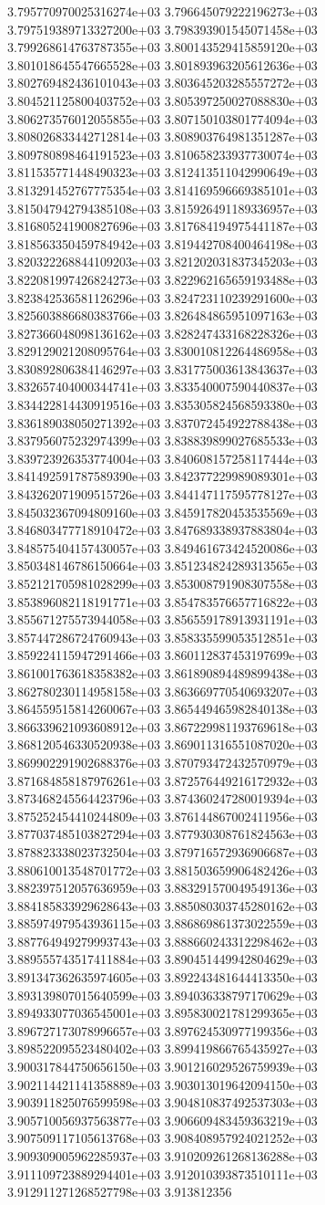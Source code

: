 3.795770970025316274e+03	3.796645079222196273e+03	3.797519389713327200e+03	3.798393901545071458e+03	3.799268614763787355e+03	3.800143529415859120e+03	3.801018645547665528e+03	3.801893963205612636e+03	3.802769482436101043e+03	3.803645203285557272e+03	3.804521125800403752e+03	3.805397250027088830e+03	3.806273576012055855e+03	3.807150103801774094e+03	3.808026833442712814e+03	3.808903764981351287e+03	3.809780898464191523e+03	3.810658233937730074e+03	3.811535771448490323e+03	3.812413511042990649e+03	3.813291452767775354e+03	3.814169596669385101e+03	3.815047942794385108e+03	3.815926491189336957e+03	3.816805241900827696e+03	3.817684194975441187e+03	3.818563350459784942e+03	3.819442708400464198e+03	3.820322268844109203e+03	3.821202031837345203e+03	3.822081997426824273e+03	3.822962165659193488e+03	3.823842536581126296e+03	3.824723110239291600e+03	3.825603886680383766e+03	3.826484865951097163e+03	3.827366048098136162e+03	3.828247433168228326e+03	3.829129021208095764e+03	3.830010812264486958e+03	3.830892806384146297e+03	3.831775003613843637e+03	3.832657404000344741e+03	3.833540007590440837e+03	3.834422814430919516e+03	3.835305824568593380e+03	3.836189038050271392e+03	3.837072454922788438e+03	3.837956075232974399e+03	3.838839899027685533e+03	3.839723926353774004e+03	3.840608157258117444e+03	3.841492591787589390e+03	3.842377229989089301e+03	3.843262071909515726e+03	3.844147117595778127e+03	3.845032367094809160e+03	3.845917820453535569e+03	3.846803477718910472e+03	3.847689338937883804e+03	3.848575404157430057e+03	3.849461673424520086e+03	3.850348146786150664e+03	3.851234824289313565e+03	3.852121705981028299e+03	3.853008791908307558e+03	3.853896082118191771e+03	3.854783576657716822e+03	3.855671275573944058e+03	3.856559178913931191e+03	3.857447286724760943e+03	3.858335599053512851e+03	3.859224115947291466e+03	3.860112837453197699e+03	3.861001763618358382e+03	3.861890894489899438e+03	3.862780230114958158e+03	3.863669770540693207e+03	3.864559515814260067e+03	3.865449465982840138e+03	3.866339621093608912e+03	3.867229981193769618e+03	3.868120546330520938e+03	3.869011316551087020e+03	3.869902291902688376e+03	3.870793472432570979e+03	3.871684858187976261e+03	3.872576449216172932e+03	3.873468245564423796e+03	3.874360247280019394e+03	3.875252454410244809e+03	3.876144867002411956e+03	3.877037485103827294e+03	3.877930308761824563e+03	3.878823338023732504e+03	3.879716572936906687e+03	3.880610013548701772e+03	3.881503659906482426e+03	3.882397512057636959e+03	3.883291570049549136e+03	3.884185833929628643e+03	3.885080303745280162e+03	3.885974979543936115e+03	3.886869861373022559e+03	3.887764949279993743e+03	3.888660243312298462e+03	3.889555743517411884e+03	3.890451449942804629e+03	3.891347362635974605e+03	3.892243481644413350e+03	3.893139807015640599e+03	3.894036338797170629e+03	3.894933077036545001e+03	3.895830021781299365e+03	3.896727173078996657e+03	3.897624530977199356e+03	3.898522095523480402e+03	3.899419866765435927e+03	3.900317844750656150e+03	3.901216029526759939e+03	3.902114421141358889e+03	3.903013019642094150e+03	3.903911825076599598e+03	3.904810837492537303e+03	3.905710056937563877e+03	3.906609483459363219e+03	3.907509117105613768e+03	3.908408957924021252e+03	3.909309005962285937e+03	3.910209261268136288e+03	3.911109723889294401e+03	3.912010393873510111e+03	3.912911271268527798e+03	3.913812356